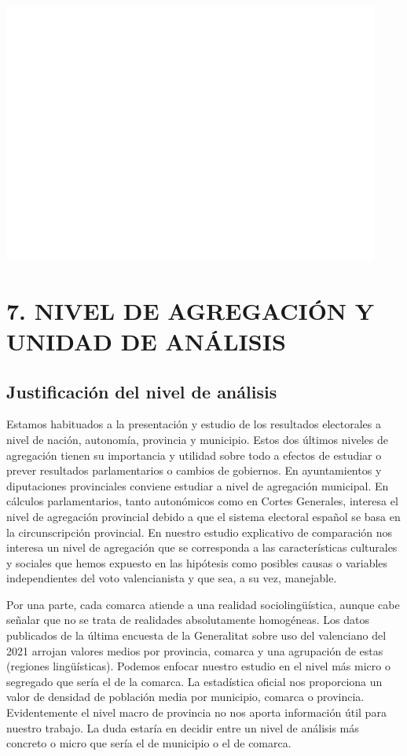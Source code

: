 \documentclass[
]{article}
\begin{document}
\includegraphics{votovalencianista-ea2023_page_files/figure-latex/especificacionesHipotesis4-1.png}

\hypertarget{nivel-de-agregaciuxf3n-y-unidad-de-anuxe1lisis}{%
\section{7. NIVEL DE AGREGACIÓN Y UNIDAD DE
ANÁLISIS}\label{nivel-de-agregaciuxf3n-y-unidad-de-anuxe1lisis}}

\hypertarget{justificaciuxf3n-del-nivel-de-anuxe1lisis}{%
\subsection{Justificación del nivel de
análisis}\label{justificaciuxf3n-del-nivel-de-anuxe1lisis}}

Estamos habituados a la presentación y estudio de los resultados
electorales a nivel de nación, autonomía, provincia y municipio. Estos
dos últimos niveles de agregación tienen su importancia y utilidad sobre
todo a efectos de estudiar o prever resultados parlamentarios o cambios
de gobiernos. En ayuntamientos y diputaciones provinciales conviene
estudiar a nivel de agregación municipal. En cálculos parlamentarios,
tanto autonómicos como en Cortes Generales, interesa el nivel de
agregación provincial debido a que el sistema electoral español se basa
en la circunscripción provincial. En nuestro estudio explicativo de
comparación nos interesa un nivel de agregación que se corresponda a las
características culturales y sociales que hemos expuesto en las
hipótesis como posibles causas o variables independientes del voto
valencianista y que sea, a su vez, manejable.

Por una parte, cada comarca atiende a una realidad sociolingüística,
aunque cabe señalar que no se trata de realidades absolutamente
homogéneas. Los datos publicados de la última encuesta de la Generalitat
sobre uso del valenciano del 2021 arrojan valores medios por provincia,
comarca y una agrupación de estas (regiones lingüísticas). Podemos
enfocar nuestro estudio en el nivel más micro o segregado que sería el
de la comarca. La estadística oficial nos proporciona un valor de
densidad de población media por municipio, comarca o provincia.
Evidentemente el nivel macro de provincia no nos aporta información útil
para nuestro trabajo. La duda estaría en decidir entre un nivel de
análisis más concreto o micro que sería el de municipio o el de comarca.
\end{document}
